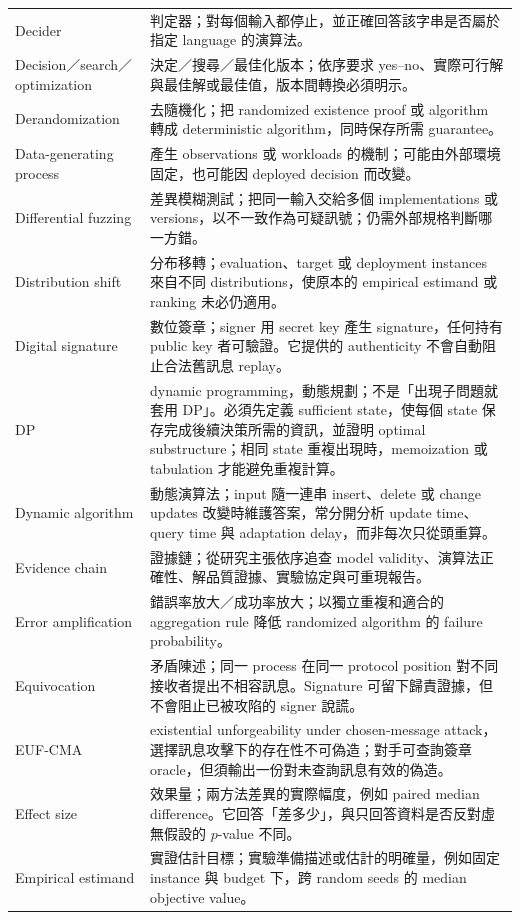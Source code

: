 \documentclass[11pt,a4paper,oneside,openany]{book}
\begin{document}
\begin{longtable}{@{}>{\raggedright\arraybackslash}p{}p{}@{}}
Decider & 判定器；對每個輸入都停止，並正確回答該字串是否屬於指定 language 的演算法。 \\
Decision／search／optimization & 決定／搜尋／最佳化版本；依序要求 yes--no、實際可行解與最佳解或最佳值，版本間轉換必須明示。 \\
Derandomization & 去隨機化；把 randomized existence proof 或 algorithm 轉成 deterministic algorithm，同時保存所需 guarantee。 \\
Data-generating process & 產生 observations 或 workloads 的機制；可能由外部環境固定，也可能因 deployed decision 而改變。 \\
Differential fuzzing & 差異模糊測試；把同一輸入交給多個 implementations 或 versions，以不一致作為可疑訊號；仍需外部規格判斷哪一方錯。 \\
Distribution shift & 分布移轉；evaluation、target 或 deployment instances 來自不同 distributions，使原本的 empirical estimand 或 ranking 未必仍適用。 \\
Digital signature & 數位簽章；signer 用 secret key 產生 signature，任何持有 public key 者可驗證。它提供的 authenticity 不會自動阻止合法舊訊息 replay。 \\
DP & dynamic programming，動態規劃；不是「出現子問題就套用 DP」。必須先定義 sufficient state，使每個 state 保存完成後續決策所需的資訊，並證明 optimal substructure；相同 state 重複出現時，memoization 或 tabulation 才能避免重複計算。 \\
Dynamic algorithm & 動態演算法；input 隨一連串 insert、delete 或 change updates 改變時維護答案，常分開分析 update time、query time 與 adaptation delay，而非每次只從頭重算。 \\
Evidence chain & 證據鏈；從研究主張依序追查 model validity、演算法正確性、解品質證據、實驗協定與可重現報告。 \\
Error amplification & 錯誤率放大／成功率放大；以獨立重複和適合的 aggregation rule 降低 randomized algorithm 的 failure probability。 \\
Equivocation & 矛盾陳述；同一 process 在同一 protocol position 對不同接收者提出不相容訊息。Signature 可留下歸責證據，但不會阻止已被攻陷的 signer 說謊。 \\
EUF-CMA & existential unforgeability under chosen-message attack，選擇訊息攻擊下的存在性不可偽造；對手可查詢簽章 oracle，但須輸出一份對未查詢訊息有效的偽造。 \\
Effect size & 效果量；兩方法差異的實際幅度，例如 paired median difference。它回答「差多少」，與只回答資料是否反對虛無假設的 $p$-value 不同。 \\
Empirical estimand & 實證估計目標；實驗準備描述或估計的明確量，例如固定 instance 與 budget 下，跨 random seeds 的 median objective value。 \\

\end{longtable}
\end{document}
